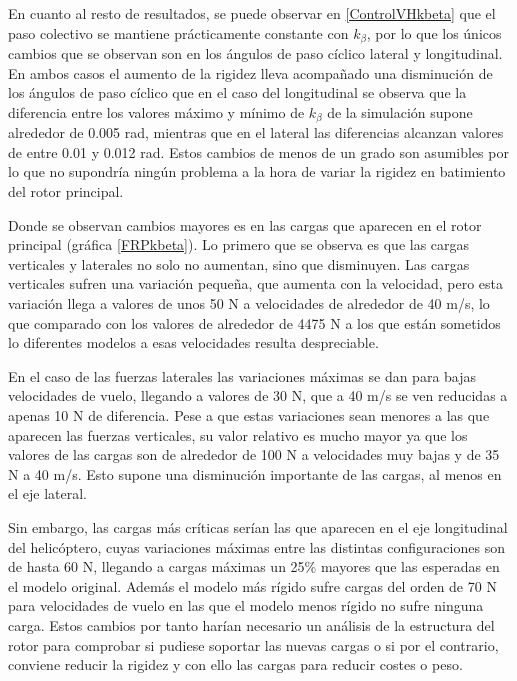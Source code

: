 En cuanto al resto de resultados, se puede observar en \ref{ControlVHkbeta} que el paso colectivo se mantiene prácticamente constante con $k_\beta$, por lo que los únicos cambios que se observan son en los ángulos de paso cíclico lateral y longitudinal. En ambos casos el aumento de la rigidez lleva acompañado una disminución de los ángulos de paso cíclico que en el caso del longitudinal se observa que la diferencia entre los valores máximo y mínimo de $k_\beta$ de la simulación supone alrededor de 0.005 rad, mientras que en el lateral las diferencias alcanzan valores de entre 0.01 y 0.012 rad. Estos cambios de menos de un grado son asumibles por lo que no supondría ningún problema a la hora de variar la rigidez en batimiento del rotor principal.

Donde se observan cambios mayores es en las cargas que aparecen en el rotor principal (gráfica \ref{FRPkbeta}). Lo primero que se observa es que las cargas verticales y laterales no solo no aumentan, sino que disminuyen. Las cargas verticales sufren una variación pequeña, que aumenta con la velocidad, pero esta variación llega a valores de unos 50 N a velocidades de alrededor de 40 m/s, lo que comparado con los valores de alrededor de 4475 N a los que están sometidos lo diferentes modelos a esas velocidades resulta despreciable.

En el caso de las fuerzas laterales las variaciones máximas se dan para bajas velocidades de vuelo, llegando a valores de 30 N, que a 40 m/s se ven reducidas a apenas 10 N de diferencia. Pese a que estas variaciones sean menores a las que aparecen las fuerzas verticales, su valor relativo es mucho mayor ya que los valores de las cargas son de alrededor de 100 N a velocidades muy bajas y de 35 N a 40 m/s. Esto supone una disminución importante de las cargas, al menos en el eje lateral.

Sin embargo, las cargas más críticas serían las que aparecen en el eje longitudinal del helicóptero, cuyas variaciones máximas entre las distintas configuraciones son de hasta 60 N, llegando a cargas máximas un 25\% mayores que las esperadas en el modelo original. Además el modelo más rígido sufre cargas del orden de 70 N para velocidades de vuelo en las que el modelo menos rígido no sufre ninguna carga. Estos cambios por tanto harían necesario un análisis de la estructura del rotor para comprobar si pudiese soportar las nuevas cargas o si por el contrario, conviene reducir la rigidez y con ello las cargas para reducir costes o peso.



\singlespacing